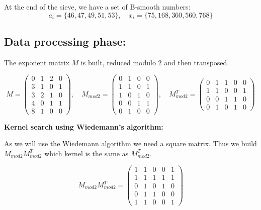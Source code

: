 \documentclass[a4paper, 11pt]{article}
\begin{document}
At the end of the sieve, we have a set of B-smooth numbers:
\begin{equation}
    a_i=\{46, 47, 49, 51, 53\}, \quad
    x_i=\{75, 168, 360, 560, 768\}
\end{equation}

\subsection{Data processing phase:}

The exponent matrix $M$ is built, reduced modulo 2 and then transposed.

\begin{equation}
    M=\begin{pmatrix}
        0 & 1 & 2 & 0 \\
        3 & 1 & 0 & 1 \\
        3 & 2 & 1 & 0 \\
        4 & 0 & 1 & 1 \\
        8 & 1 & 0 & 0
    \end{pmatrix}
    , \quad M_{mod2}=
    \begin{pmatrix}
        0 & 1 & 0 & 0 \\
        1 & 1 & 0 & 1 \\
        1 & 0 & 1 & 0 \\
        0 & 0 & 1 & 1 \\
        0 & 1 & 0 & 0
    \end{pmatrix}
    , \quad M_{mod2}^T=
    \begin{pmatrix}
        0 & 1 & 1 & 0 & 0 \\
        1 & 1 & 0 & 0 & 1 \\
        0 & 0 & 1 & 1 & 0 \\
        0 & 1 & 0 & 1 & 0
    \end{pmatrix}
\end{equation}

\textbf{Kernel search using Wiedemann's algorithm:}

As we will use the Wiedemann algorithm we need a square matrix. Thus we build $M_{mod2}M_{mod2}^T$ which kernel is the same as $M_{mod2}^T$.

\begin{equation}
    M_{mod2}M_{mod2}^T=
    \begin{pmatrix}
        1 & 1 & 0 & 0 & 1 \\
        1 & 1 & 1 & 1 & 1 \\
        0 & 1 & 0 & 1 & 0 \\
        0 & 1 & 1 & 0 & 0 \\
        1 & 1 & 0 & 0 & 1
    \end{pmatrix}
\end{equation}
\end{document}
